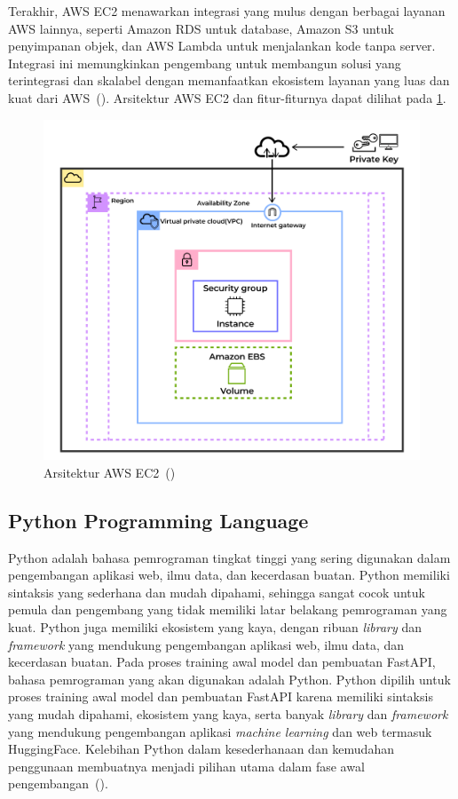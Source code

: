 Terakhir, AWS EC2 menawarkan integrasi yang mulus dengan berbagai layanan AWS lainnya, seperti Amazon RDS untuk database, Amazon S3 untuk penyimpanan objek, dan AWS Lambda untuk menjalankan kode tanpa server. Integrasi ini memungkinkan pengembang untuk membangun solusi yang terintegrasi dan skalabel dengan memanfaatkan ekosistem layanan yang luas dan kuat dari AWS~(\cite{chen2023}). 
Arsitektur AWS EC2 dan fitur-fiturnya dapat dilihat 
pada \ref{fig:awsEC2Architecture}.

\begin{figure}[H]
  \centering
  \includegraphics[scale=0.4]{gambar/ec2arsitektur.png}
  \caption{Arsitektur AWS EC2~(\cite{geeksforgeeks})}
  \label{fig:awsEC2Architecture}
\end{figure}


\subsection{Python Programming Language}
Python adalah bahasa pemrograman tingkat tinggi yang sering
digunakan dalam pengembangan aplikasi web, ilmu data, dan
kecerdasan buatan. Python memiliki sintaksis yang sederhana
dan mudah dipahami, sehingga sangat cocok untuk pemula dan
pengembang yang tidak memiliki latar belakang pemrograman
yang kuat. Python juga memiliki ekosistem yang kaya, dengan
ribuan \emph{library} dan \emph{framework} yang mendukung
pengembangan aplikasi web, ilmu data, dan kecerdasan buatan.
Pada proses training awal model dan pembuatan FastAPI, bahasa 
pemrograman yang akan digunakan adalah Python. Python dipilih 
untuk proses training awal model dan pembuatan FastAPI karena 
memiliki sintaksis yang mudah dipahami, ekosistem yang kaya, 
serta banyak \emph{library} dan \emph{framework} yang 
mendukung pengembangan aplikasi \emph{machine learning} dan 
web termasuk HuggingFace. Kelebihan Python dalam kesederhanaan 
dan kemudahan penggunaan membuatnya menjadi pilihan utama dalam 
fase awal pengembangan~(\cite{sharma2020}).


